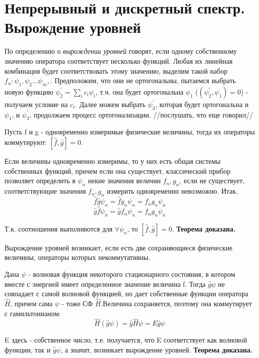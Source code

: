 \newpage
\chapter{Непрерывный и дискретный спектр. Вырождение уровней}
\par По определению о \textit{вырождении уровней} говорят, если одному собственному значению оператора соответствует несколько функций. Любая их линейная комбинация будет соответствовать этому значению, выделим такой набор $f_n: \psi_1{,}\psi_2{...}\psi_m{,}$. Предположим, что они не ортогональны, пытаемся выбрать новую функцию $\psi_2^\prime = \sum_i c_i \psi_i$, т.ч. она будет ортогональна $\psi_1$ ($(\psi_2^\prime{,}\psi_1) =0$) - получаем условие на $c_i$. Далее можем выбрать $\psi_3^\prime$, которая будет ортогональна и $\psi_1$, и $\psi_2^\prime$, продолжаем процесс ортогонализации. //послушать, что еще говорил//
\par \begin{theorem} Пусть f и g - одновременно измеримые физические величины, тогда их операторы коммутируют: $[\hat{f}{,}\hat{g}]=0$.
\par \proof  Если величины одновременно измеримы, то у них есть общая системы собственных функций, причем если она существует, классический прибор позволяет определить в $\psi_n$ некие значения величин $f_n{,}g_n$, если не существует, соответствующие значения $f_n{,}g_n$ измерить одновременно невозможно. Итак, 
$$ \hat{f}\hat{g}\psi_n = \hat{f} g_n \psi_n = f_n g_n \psi_n $$
$$ \hat{g}\hat{f}\psi_n = \hat{g} f_n \psi_n = f_n g_n \psi_n $$
\par Т.к. соотношения выполняются для $\forall \psi_n$, то $[\hat{f}{,}\hat{g}]=0$. \textbf{Теорема доказана.}
\end{theorem}
\par \begin{theorem} Вырождение уровней возникает, если есть две сохраняющиеся физические величины, операторы которых некоммутативны.
\par \proof  Дана $\psi$ - волновая функция некоторого стационарного состояния, в котором вместе с энергией имеет определенное значение величина f. Тогда $\hat{g}\psi$ не совпадает с самой волновой функцией, но дает собственные функции оператора $\hat{H}$, причем сама $\psi$ - тоже СФ $\hat{H}$.Величина сохраняется, поэтому она коммутирует с гамильтонианом:
$$ \hat{H} (\hat{g}\psi) = \hat{g}\hat{H}\psi = E \hat{g}\psi$$
\par E здесь - собственное число, т.е. получается, что E соответствует как волновой функции, так и $\hat{g}\psi$, а значит, возникает вырождение уровней. \textbf{Теорема доказана.}
\end{theorem}
